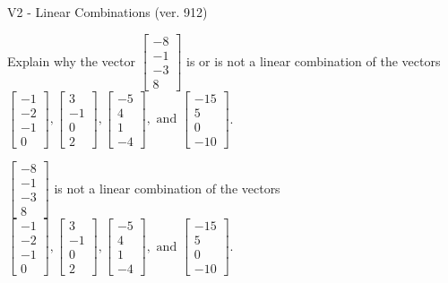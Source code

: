 \begin{exercise}
  \begin{exerciseTitle}V2 - Linear Combinations (ver. 912)\end{exerciseTitle}
  \begin{exerciseStatement}
    Explain why the vector \(\left[\begin{array}{c}
-8 \\
-1 \\
-3 \\
8
\end{array}\right]\)  is or is not a linear 
	combination of the vectors \(\left[\begin{array}{c}
-1 \\
-2 \\
-1 \\
0
\end{array}\right] , \left[\begin{array}{c}
3 \\
-1 \\
0 \\
2
\end{array}\right] , \left[\begin{array}{c}
-5 \\
4 \\
1 \\
-4
\end{array}\right] , \text{ and } \left[\begin{array}{c}
-15 \\
5 \\
0 \\
-10
\end{array}\right]\).
	


  \end{exerciseStatement}
  \begin{exerciseAnswer}
   \(\left[\begin{array}{c}
-8 \\
-1 \\
-3 \\
8
\end{array}\right]\) 
  	 is not  
	a linear combination of the vectors \(\left[\begin{array}{c}
-1 \\
-2 \\
-1 \\
0
\end{array}\right] , \left[\begin{array}{c}
3 \\
-1 \\
0 \\
2
\end{array}\right] , \left[\begin{array}{c}
-5 \\
4 \\
1 \\
-4
\end{array}\right] , \text{ and } \left[\begin{array}{c}
-15 \\
5 \\
0 \\
-10
\end{array}\right]\).


\end{exerciseAnswer}
\end{exercise}
